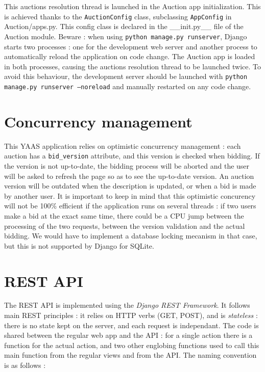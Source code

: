 \documentclass[a4paper, 11pt]{report}
\begin{document}
    This auctions resolution thread is launched in the Auction app initialization. This is achieved thanks to the \texttt{AuctionConfig} class, subclassing \texttt{AppConfig} in Auction/apps.py. This config class is declared in the \_\_init.py\_\_ file of the Auction module. Beware : when using \texttt{python manage.py runserver}, Django starts two processes : one for the development web server and another process to automatically reload the application on code change. The Auction app is loaded in both processes, causing the auctions resolution thread to be launched twice. To avoid this behaviour, the development server should be launched with \texttt{python manage.py runserver --noreload} and manually restarted on any code change. 

    \section{Concurrency management}

    This YAAS application relies on optimistic concurrency management : each auction has a \texttt{bid\_version} attribute, and this version is checked when bidding. If the version is not up-to-date, the bidding process will be aborted and the user will be asked to refresh the page so as to see the up-to-date version. An auction version will be outdated when the description is updated, or when a bid is made by another user. It is important to keep in mind that this optimistic concurency will not be 100\% efficient if the application runs on several threads : if two users make a bid at the exact same time, there could be a CPU jump between the processing of the two requests, between the version validation and the actual bidding. We would have to implement a database locking mecanism in that case, but this is not supported by Django for SQLite. 

    \section{REST API}

    The REST API is implemented using the \textit{Django REST Framework}. It follows main REST principles : it relies on HTTP verbs (GET, POST), and is \textit{stateless} : there is no state kept on the server, and each request is independant. The code is shared between the regular web app and the API : for a single action there is a function for the actual action, and two other englobing functions used to call this main function from the regular views and from the API. The naming convention is as follows :
\end{document}
